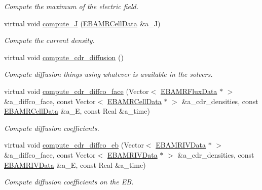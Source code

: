 \begin{DoxyCompactItemize}
\begin{DoxyCompactList}\small\item\em Compute the maximum of the electric field. \end{DoxyCompactList}\item 
virtual void \hyperlink{classtime__stepper_af95b3e224961dc31f0cbfac6ff7063e1}{compute\+\_\+J} (\hyperlink{type__definitions_8H_a7e610f301989e5e07781c5e338bdb7c3}{E\+B\+A\+M\+R\+Cell\+Data} \&a\+\_\+J)
\begin{DoxyCompactList}\small\item\em Compute the current density. \end{DoxyCompactList}\item 
virtual void \hyperlink{classtime__stepper_aa8ae8f71e0ab42184e07d0822b28004c}{compute\+\_\+cdr\+\_\+diffusion} ()
\begin{DoxyCompactList}\small\item\em Compute diffusion things using whatever is available in the solvers. \end{DoxyCompactList}\item 
virtual void \hyperlink{classtime__stepper_a978973f70bb5bd725b7c3406f3d7e8c5}{compute\+\_\+cdr\+\_\+diffco\+\_\+face} (Vector$<$ \hyperlink{type__definitions_8H_aadad278b2e5d3d4abcf9032f90ba78c3}{E\+B\+A\+M\+R\+Flux\+Data} $\ast$ $>$ \&a\+\_\+diffco\+\_\+face, const Vector$<$ \hyperlink{type__definitions_8H_a7e610f301989e5e07781c5e338bdb7c3}{E\+B\+A\+M\+R\+Cell\+Data} $\ast$ $>$ \&a\+\_\+cdr\+\_\+densities, const \hyperlink{type__definitions_8H_a7e610f301989e5e07781c5e338bdb7c3}{E\+B\+A\+M\+R\+Cell\+Data} \&a\+\_\+E, const Real \&a\+\_\+time)
\begin{DoxyCompactList}\small\item\em Compute diffusion coefficients. \end{DoxyCompactList}\item 
virtual void \hyperlink{classtime__stepper_a34c2c569e2e3b7e1d25c13d460ca10dc}{compute\+\_\+cdr\+\_\+diffco\+\_\+eb} (Vector$<$ \hyperlink{type__definitions_8H_a6b8fa905d55cbb491b52180386f0e0c1}{E\+B\+A\+M\+R\+I\+V\+Data} $\ast$ $>$ \&a\+\_\+diffco\+\_\+face, const Vector$<$ \hyperlink{type__definitions_8H_a6b8fa905d55cbb491b52180386f0e0c1}{E\+B\+A\+M\+R\+I\+V\+Data} $\ast$ $>$ \&a\+\_\+cdr\+\_\+densities, const \hyperlink{type__definitions_8H_a6b8fa905d55cbb491b52180386f0e0c1}{E\+B\+A\+M\+R\+I\+V\+Data} \&a\+\_\+E, const Real \&a\+\_\+time)
\begin{DoxyCompactList}\small\item\em Compute diffusion coefficients on the EB. \end{DoxyCompactList}\item 

\end{DoxyCompactItemize}
